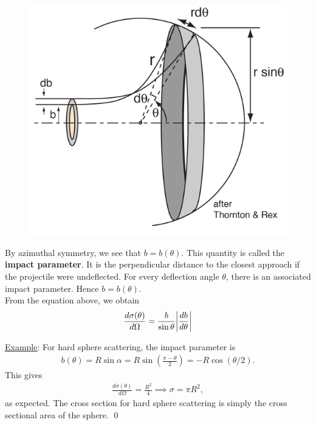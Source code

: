 \documentclass{book}
\theoremstyle{definition}
\newcommand{\al}{\alpha}
\newcommand{\f}[2]{\frac{#1}{#2}}
\newcommand{\lp}{\left(}
\newcommand{\rp}{\right)}
\begin{document}
\begin{figure}[!htb]
	\centering
	\includegraphics[scale=1.5]{figures/Ruthcross.png}
\end{figure}

By azimuthal symmetry, we see that $b = b(\theta)$. This quantity is called the \textbf{impact parameter}. It is the perpendicular distance to the closest approach if the projectile were undeflected. For every deflection angle $\theta$, there is an associated impact parameter. Hence $b = b(\theta)$. \\


From the equation above, we obtain
\begin{align*}
	\f{d\sigma(\theta)}{d\Omega} = \f{b}{\sin\theta} \abs{\f{db}{d\theta}}
\end{align*}

\noindent \underline{Example}: For hard sphere scattering, the impact parameter is 
\begin{align*}
	b(\theta) = R\sin\al = R\sin \lp \f{\pi - \theta}{2} \rp = -R\cos(\theta/2).
\end{align*}
This gives
\begin{align*}
	\f{d\sigma(\theta)}{d\Omega} = \f{R^2}{4} \implies \sigma = \pi R^2,
\end{align*}
as expected. The cross section for hard sphere scattering is simply the cross sectional area of the sphere. \qed\\
\end{document}
